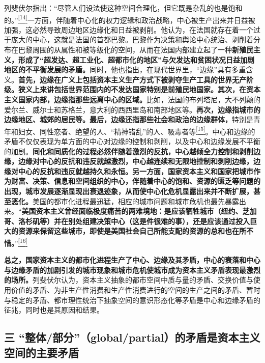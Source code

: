 \documentclass[UTF8, fontset = sourcesans, a4paper, oneside, zihao =
-4, scheme=chinese, no-math, space=true]{ctexbook}
\begin{document}
列斐伏尔指出：``尽管人们设法使这种空间合理化，但它既是杂乱的也是饱和的。''\protect\hypertarget{part0008_split_001.htmlux5cux23w14}{}{}\protect\hyperlink{part0008_split_003.htmlux5cux23m14}{\textsuperscript{{[}14{]}}}一方面，伴随着中心化的权力逻辑和政治战略，中心被生产出来并日益被加强，这必然导致周边地区边缘化和日益被剥削。他认为，在法国就存在着一个过于庞大的中心，这就是法国的首都巴黎。巴黎作为决策和舆论中心统治、剥削着分布在巴黎周围的从属性和被等级化的空间，从而在法国内部建立起了一种\textbf{新殖民主义，形成了``超发达、超工业化、超都市化的地区''与欠发达和贫困状况日益加剧地区的不平衡发展的矛盾。}同时，他也指出，在现代世界里，``边缘''具有多重含义。\textbf{首先，边缘在广义上包括资本主义生产方式下被剥夺生产工具的世界无产阶级。狭义上来讲包括世界范围内的不发达国家特别是前殖民地国家。其次，在资本主义国家内部，边缘指那些远离中心的区域。}比如，法国的布列塔尼，大不列颠的爱尔兰、威尔士和苏格兰，意大利的西西里岛和南部地区等。\textbf{再次，边缘指城市的边缘地区、城郊的居民等。最后，边缘还指那些社会和政治的边缘群体，}特别是青年和妇女、同性恋者、绝望的人、``精神错乱''的人、吸毒者等\protect\hypertarget{part0008_split_001.htmlux5cux23w15}{}{}\protect\hyperlink{part0008_split_003.htmlux5cux23m15}{\textsuperscript{{[}15{]}}}。中心和边缘的矛盾不仅仅表现为单方面的中心对边缘的控制和剥削，以及中心和边缘发展不平衡的加剧。\textbf{同化和同质化的过程必然伴随着激烈的反抗，中心越倾全力控制和剥削边缘，边缘对中心的反抗和违反就越激烈，中心越连续和无限地控制和剥削边缘，边缘对中心的反抗和违反就越持久和永恒。另一方面，国家资本主义和国家把城市作为财富、决策、信息和空间组织的中心，伴随着中心的饱和、资源的匮乏等问题的出现，城市发展逐渐显现出衰退迹象，从而使中心化危机显露出来并不断扩展，甚至恶化。}美国的都市化进程最迅猛，相应的城市问题和城市危机也最先暴露出来。``\textbf{美国资本主义曾经面临极度痛苦的两难境地：是应该牺牲城市（纽约、芝加哥、洛杉矶等）并在别处组建决策中心（这是件很难的事），还是应该通过投入巨大的资源来保留这些城市，即使是美国社会自己所能支配的资源的总和也在所不惜。}''\protect\hypertarget{part0008_split_001.htmlux5cux23w16}{}{}\protect\hyperlink{part0008_split_003.htmlux5cux23m16}{\textsuperscript{{[}16{]}}}

\textbf{总之，国家资本主义的都市化进程生产了中心、边缘及其矛盾，中心的衰落和中心与边缘矛盾的加剧引发的城市现象和城市危机使城市成为资本主义矛盾表现最激烈的场所。}列斐伏尔认为，资本主义抽象的都市空间中质与量的矛盾、交换价值与使用价值的矛盾、为非生产性消费和生产性消费进行的空间的生产之间的矛盾、暂时与稳定的矛盾、都市理性统治下抽象空间的意识形态化等矛盾是中心和边缘矛盾的征兆，同时也是其原因和结果。

\subsection{\texorpdfstring{三
``整体/部分''（global/partial）的矛盾是资本主义空间的主要矛盾}{三 整体/部分（global/partial）的矛盾是资本主义空间的主要矛盾}}\label{part0008_split_001.htmlux5cux23c038}
\end{document}

